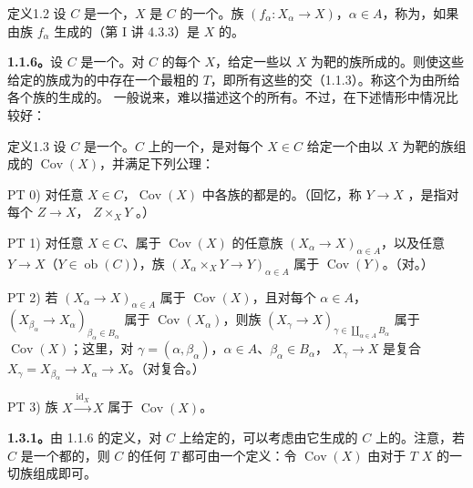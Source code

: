 \begin{SGAresult}{定义}{1.2}
设 $C$ 是一个，$X$ 是 $C$ 的一个。族 $(f_\alpha:X_\alpha\to X)$，$\alpha\in A$，称为，如果由族 $f_\alpha$ 生成的（第 I 讲 4.3.3）是 $X$ 的。
\end{SGAresult}
\textbf{1.1.6。}设 $C$ 是一个。对 $C$ 的每个 $X$，给定一些以 $X$ 为靶的族所成的。则使这些给定的族成为的中存在一个最粗的 $T$，即所有这些的交（1.1.3）。称这个为由所给各个族的生成的。
一般说来，难以描述这个的所有。不过，在下述情形中情况比较好：
\begin{SGAresult}{定义}{1.3}
设 $C$ 是一个。$C$ 上的一个，是对每个 $X\in C$ 给定一个由以 $X$ 为靶的族组成的 $\operatorname{Cov}(X)$，并满足下列公理：
\par PT 0) 对任意 $X\in C$，$\operatorname{Cov}(X)$ 中各族的都是的。（回忆，称 $Y\to X$ ，是指对每个 $Z\to X$， $Z\times_XY$ 。）
\par PT 1) 对任意 $X\in C$、属于 $\operatorname{Cov}(X)$ 的任意族 $(X_\alpha\to X)_{\alpha\in A}$，以及任意 $Y\to X$（$Y\in\operatorname{ob}(C)$），族 $(X_\alpha\times_XY\to Y)_{\alpha\in A}$ 属于 $\operatorname{Cov}(Y)$。（对。）
\par PT 2) 若 $(X_\alpha\to X)_{\alpha\in A}$ 属于 $\operatorname{Cov}(X)$，且对每个 $\alpha\in A$，$(X_{\beta_\alpha}\to X_\alpha)_{\beta_\alpha\in B_\alpha}$ 属于 $\operatorname{Cov}(X_\alpha)$，则族 $(X_\gamma\to X)_{\gamma\in\coprod_{\alpha\in A}B_\alpha}$ 属于 $\operatorname{Cov}(X)$；这里，对 $\gamma=(\alpha,\beta_\alpha)$，$\alpha\in A$、$\beta_\alpha\in B_\alpha$， $X_\gamma\to X$ 是复合 $X_\gamma=X_{\beta_\alpha}\to X_\alpha\to X$。（对复合。）
\par PT 3) 族 $X\xrightarrow{\mathrm{id}_X}X$ 属于 $\operatorname{Cov}(X)$。
\end{SGAresult}
\textbf{1.3.1。}由 1.1.6 的定义，对 $C$ 上给定的，可以考虑由它生成的 $C$ 上的。注意，若 $C$ 是一个都的，则 $C$ 的任何 $T$ 都可由一个定义：令 $\operatorname{Cov}(X)$ 由对于 $T$  $X$ 的一切族组成即可。


